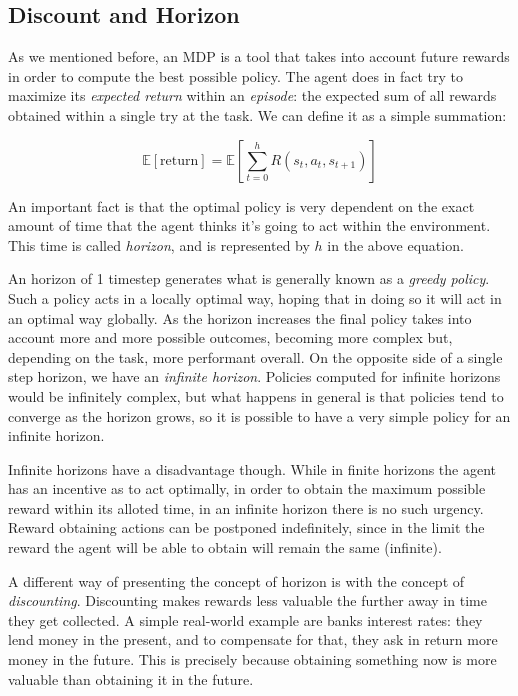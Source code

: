 \subsection{Discount and Horizon}

As we mentioned before, an MDP is a tool that takes into account future rewards in order to compute
the best possible policy. The agent does in fact try to maximize its \textit{expected return} within
an \textit{episode}: the expected sum of all rewards obtained within a single try at the task. We
can define it as a simple summation:

\[ \mathbb{E}[\text{return}] = \mathbb{E} \left [ \sum_{t=0}^h R(s_t, a_t, s_{t+1}) \right ] \]

An important fact is that the optimal policy is very dependent on the exact amount of time that the
agent thinks it's going to act within the environment. This time is called \textit{horizon}, and is
represented by $h$ in the above equation.

An horizon of 1 timestep generates what is generally known as a \textit{greedy policy}. Such a
policy acts in a locally optimal way, hoping that in doing so it will act in an optimal way
globally. As the horizon increases the final policy takes into account more and more possible
outcomes, becoming more complex but, depending on the task, more performant overall. On the opposite
side of a single step horizon, we have an \textit{infinite horizon}. Policies computed for infinite
horizons would be infinitely complex, but what happens in general is that policies tend to converge
as the horizon grows, so it is possible to have a very simple policy for an infinite horizon.

Infinite horizons have a disadvantage though. While in finite horizons the agent has an incentive as
to act optimally, in order to obtain the maximum possible reward within its alloted time, in an
infinite horizon there is no such urgency. Reward obtaining actions can be postponed indefinitely,
since in the limit the reward the agent will be able to obtain will remain the same (infinite).

A different way of presenting the concept of horizon is with the concept of \textit{discounting}.
Discounting makes rewards less valuable the further away in time they get collected. A simple
real-world example are banks interest rates: they lend money in the present, and to compensate for
that, they ask in return more money in the future. This is precisely because obtaining something now
is more valuable than obtaining it in the future.

